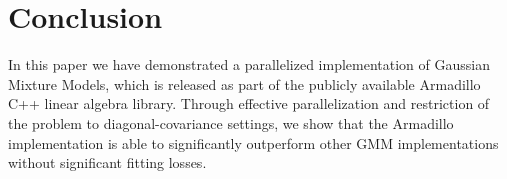 \section{Conclusion}

In this paper we have demonstrated a parallelized implementation of Gaussian
Mixture Models, which is released as part of the publicly available Armadillo
C++ linear algebra library.  Through effective parallelization and restriction
of the problem to diagonal-covariance settings, we show that the Armadillo
implementation is able to significantly outperform other GMM implementations
without significant fitting losses.
